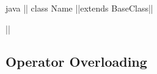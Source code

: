 \begin{sectionbox}\nospacing
 \begin{mintlinebox}{java}
 || class Name |\optla|extends BaseClass|\optra|{
   
 }|\opta{;}|
 \end{mintlinebox} 
\end{sectionbox}
\subsection{Operator Overloading}

